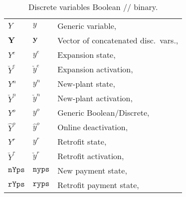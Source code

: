 \documentclass{amsart}
\begin{document}
\begin{table}[h]
    \caption{Discrete variables Boolean // binary.}
    \begin{tabular}{@{}lll@{}}
        $Y$ & $y$ & Generic variable, \\
        $\bm{Y}$ & $\bm{y}$ & Vector of concatenated disc.\ vars., \\
        $Y^e$ & $y^e$ & Expansion state, \\
        $\check{Y}^e$ & $\check{y}^e$ & Expansion activation, \\
        $Y^n$ & $y^n$ & New-plant state, \\
        $\check{Y}^n$ & $\check{y}^n$ & New-plant activation, \\
        $Y^o$ & $y^o$ & Generic Boolean/Discrete, \\
        $\hat{Y}^o$ & $\hat{y}^o$ & Online deactivation, \\
        $Y^r$ & $y^r$ & Retrofit state, \\
        $\check{Y}^r$ & $\check{y}^r$ & Retrofit activation, \\
        $\mathtt{nYps}$ & $\mathtt{nyps}$ & New payment state, \\
        $\mathtt{rYps}$ & $\mathtt{ryps}$ & Retrofit payment state, \\
    \end{tabular}\label{tab:bools}
\end{table}
%
\end{document}
